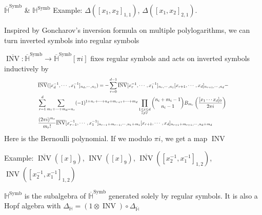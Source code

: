 \documentclass[8pt]{beamer}
\DeclareMathOperator{\Symb}{Symb}
\DeclareMathOperator{\INV}{INV}
\theoremstyle{definition}
\theoremstyle{remark}
\begin{document}
\begin{frame}[t]{$\overline{\mathbb H}^{\Symb}$ \& $\mathbb H^{\Symb}$}
Example: $\Delta([x_1,x_2]_{1,1})$, $\Delta([x_1,x_2]_{2,1})$.
\vspace{10pt}

Inspired by Goncharov's inversion formula on multiple polylogarithms, we can turn inverted symbols into regular symbols
\begin{definition}
$\overline{\INV}:\overline{\mathbb H}^{\Symb}\to\overline{\mathbb H}^{\Symb}[\pi i]$ fixes regular symbols and acts on inverted symbols inductively by
\begin{equation}
\scalebox{.7}{$
\begin{aligned}
&\overline{\INV}([x_d^{-1},\cdots,x_1^{-1}]_{n_d,\cdots,n_1})=-\sum_{r=0}^{d-1}\overline{\INV}[x_r^{-1},\cdots,x_1^{-1}]_{n_r,\cdots,n_1}[x_{r+1},\cdots,x_d]_{n_{r+1},\cdots,n_d}-\\
&\sum_{r=1}^d\sum_{m_1+\cdots+m_d=n_r}(-1)^{1+n_r+\cdots+n_d+m_{r+1}+\cdots+m_d}\prod_{\substack{1\leq i\leq d\\i\neq r}}\binom{n_i+m_i-1}{n_i-1}B_{m_r}\left(\frac{[x_1\cdots x_d]_0}{2\pi i}\right)\\
&\frac{(2\pi i)^{m_r}}{m_r!}\overline{\INV}[x_{r-1}^{-1},\cdots,x_1^{-1}]_{n_{r-1}+m_{r-1},\cdots,n_1+m_1}[x_{r+1},\cdots,x_d]_{n_{r+1}+m_{r+1},\cdots,n_d+m_d}
\end{aligned}
$}
\end{equation}
Here  is the Bernoulli polynomial. If we modulo $\pi i$, we get a map $\INV$
\end{definition}
\vspace{10pt}

Example: $\overline{\INV}([x]_9)$, $\INV([x]_9)$, $\overline{\INV}([x_2^{-1},x_1^{-1}]_{1,2})$, $\INV([x_2^{-1},x_1^{-1}]_{1,2})$
\vspace{10pt}

$\mathbb H^{\Symb}$ is the subalgebra of $\overline{\mathbb H}^{\Symb}$ generated solely by regular symbols. It is also a Hopf algebra with $\Delta_{\mathbb H}=(1\otimes\INV)\circ\Delta_{\overline{\mathbb H}}$
\end{frame}
\end{document}
